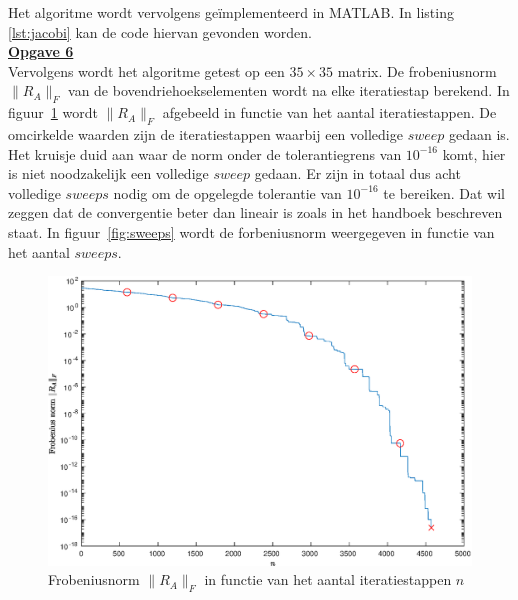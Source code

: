 \documentclass[a4paper, 12pt, titlepage, fleqn]{article}
\begin{document}
Het algoritme wordt vervolgens ge\"implementeerd in MATLAB. In listing \ref{lst:jacobi} kan de code hiervan gevonden worden.\\

\underline{\textbf{Opgave 6}}\\

 Vervolgens wordt het algoritme getest op een $35\times35$ matrix. De frobeniusnorm $\|R_A\|_F$ van de bovendriehoekselementen wordt na elke iteratiestap berekend. In figuur~\ref{fig:jacobiFout} wordt $\|R_A\|_F$ afgebeeld in functie van het aantal iteratiestappen. De omcirkelde waarden zijn de iteratiestappen waarbij een volledige $sweep$ gedaan is. Het kruisje duid aan waar de norm onder de tolerantiegrens van $10^{-16}$ komt, hier is niet noodzakelijk een volledige $sweep$ gedaan. Er zijn in totaal dus acht volledige $sweeps$ nodig om de opgelegde tolerantie van $10^{-16}$ te bereiken. Dat wil zeggen dat de convergentie beter dan lineair is zoals in het handboek beschreven staat. In figuur~\ref{fig:sweeps} wordt de forbeniusnorm weergegeven in functie van het aantal $sweeps$. 

\begin{figure}
 \centering
 \includegraphics[scale=0.55]{../Afbeeldingen/fout-jacobi.eps}
 \caption{Frobeniusnorm $\|R_A\|_F$ in functie van het aantal iteratiestappen $n$}
 \label{fig:jacobiFout}
 \end{figure} 
 
\end{document}
